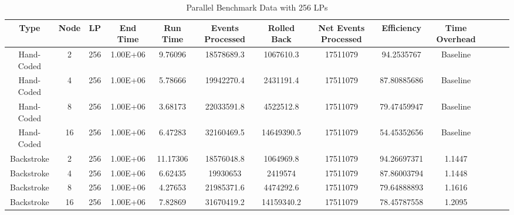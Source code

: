 \begin{table}
\begin{center}
\tiny\addtolength{\tabcolsep}{-5pt}
\caption{Parallel Benchmark Data with 256 LPs}
\label{table:parallel_data_256}

\begin{tabular}{|c|c|c|c|c|c|c|c|c|c|c|c|c|}\hline
Type & Node & LP & End Time & Run Time & Events Processed & Rolled Back & Net Events Processed & Efficiency & Time Overhead  \\\hline

Hand-Coded      & 2     & 256   & 1.00E+06      & 9.76096       & 18578689.3    & 1067610.3        & 17511079      & 94.2535767         & Baseline \\\hline
Hand-Coded      & 4     & 256   & 1.00E+06      & 5.78666       & 19942270.4    & 2431191.4        & 17511079      & 87.80885686         & Baseline \\\hline
Hand-Coded      & 8     & 256   & 1.00E+06      & 3.68173       & 22033591.8    & 4522512.8        & 17511079      & 79.47459947       & Baseline \\\hline
Hand-Coded      & 16 & 256      & 1.00E+06      & 6.47283       & 32160469.5    & 14649390.5       & 17511079      & 54.45352656        & Baseline \\\hline
                                                                                                
Backstroke      & 2     & 256   & 1.00E+06      & 11.17306      & 18576048.8    & 1064969.8        & 17511079      & 94.26697371      & 1.1447 \\\hline
Backstroke      & 4     & 256   & 1.00E+06      & 6.62435       & 19930653     & 2419574              & 17511079      & 87.86003794       & 1.1448 \\\hline
Backstroke      & 8     & 256   & 1.00E+06      & 4.27653       & 21985371.6    & 4474292.6        & 17511079      & 79.64888893         & 1.1616 \\\hline
Backstroke      & 16 & 256      & 1.00E+06      & 7.82869       & 31670419.2    & 14159340.2       & 17511079       &  78.45787558       & 1.2095 \\\hline

\end{tabular}
\end{center}
\end{table}


